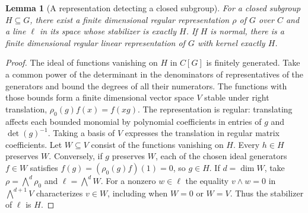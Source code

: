 \documentclass[11pt,oneside,openany]{book}
\newtheorem{lemma}[theorem]{Lemma}
\theoremstyle{definition}
\theoremstyle{remark}
\begin{document}
\begin{lemma}[A representation detecting a closed subgroup]
\label{res:PV15}
For a closed subgroup \(H\subseteq G\), there exist a finite
dimensional regular representation \(\rho\) of \(G\) over \(C\)
and a line \(\ell\) in its space whose stabilizer is exactly \(H\).
If \(H\) is normal, there is a finite dimensional regular
linear representation of \(G\) with kernel exactly \(H\).
\end{lemma}

\begin{proof}
The ideal of functions vanishing on \(H\) in \(C[G]\) is
finitely generated. Take a common power of the determinant in
the denominators of representatives of the generators and bound
the degrees of all their numerators. The functions with those
bounds form a finite dimensional vector space \(V\) stable
under right translation, \(\rho_0(g)f(x)=f(xg)\).
The representation is regular: translating affects each bounded
monomial by polynomial coefficients in entries of \(g\) and
\(\det(g)^{-1}\). Taking a basis of \(V\) expresses the translation
in regular matrix coefficients. Let \(W\subseteq V\) consist of
the functions vanishing on \(H\). Every \(h\in H\) preserves
\(W\). Conversely, if \(g\) preserves \(W\), each of the chosen
ideal generators \(f\in W\) satisfies \(f(g)=(\rho_0(g)f)(1)=0\),
so \(g\in H\). If \(d=\dim W\), take
\(\rho=\bigwedge^d\rho_0\) and \(\ell=\bigwedge^d W\).
For a nonzero \(w\in\ell\) the equality \(v\wedge w=0\) in
\(\bigwedge^{d+1}V\) characterizes \(v\in W\), including when
\(W=0\) or \(W=V\). Thus the stabilizer of \(\ell\) is \(H\).


\end{proof}
\end{document}
